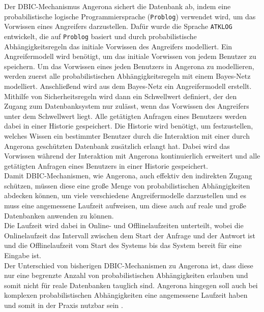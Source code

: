 \documentclass[german,version-2020-11]{uzl-thesis}
\begin{document}
Der DBIC-Mechanismus Angerona sichert die Datenbank ab, indem eine probabilistische logische Programmiersprache (\texttt{Problog}) verwendet wird, um das Vorwissen eines Angreifers darzustellen. Dafür wurde die Sprache \texttt{ATKLOG} entwickelt, die auf \texttt{Problog} basiert und durch probabilistische Abhängigkeitsregeln das initiale Vorwissen des Angreifers modelliert. Ein Angreifermodell wird benötigt, um das initiale Vorwissen von jedem Benutzer zu speichern.  Um das Vorwissen eines jeden Benutzers in Angerona zu modellieren, werden zuerst alle probabilistischen Abhängigkeitsregeln mit einem Bayes-Netz modelliert. Anschließend wird aus dem Bayes-Netz ein Angreifermodell erstellt. Mithilfe von Sicherheitsregeln wird dann ein Schwellwert definiert, der den Zugang zum Datenbanksystem nur zulässt, wenn das Vorwissen des Angreifers unter dem Schwellwert liegt. Alle getätigten Anfragen eines Benutzers werden dabei in einer Historie gespeichert. Die Historie wird benötigt, um festzustellen, welches Wissen ein bestimmter Benutzer durch die Interaktion mit einer durch Angerona geschützten Datenbank zusätzlich erlangt hat. Dabei wird das Vorwissen während der Interaktion mit Angerona kontinuierlich erweitert und alle getätigten Anfragen eines Benutzers in einer Historie gespeichert. \\  
Damit DBIC-Mechanismen, wie Angerona, auch effektiv den indirekten Zugang schützen, müssen diese eine große Menge von probabilistischen Abhängigkeiten abdecken können, um viele verschiedene Angreifermodelle darzustellen und es muss eine angemessene Laufzeit aufweisen, um diese auch auf reale und große Datenbanken anwenden zu können.\\
Die Laufzeit wird dabei in Online- und Offlinelaufzeiten unterteilt, wobei die Onlinelaufzeit  das Intervall zwischen dem Start der Anfrage und der Antwort ist und die Offlinelaufzeit  vom Start des Systems bis das System bereit für eine Eingabe ist. \\
Der Unterschied von bisherigen DBIC-Mechanismen zu Angerona ist, dass diese nur eine begrenzte Anzahl von probabilistischen Abhängigkeiten erlauben und somit nicht für reale Datenbanken tauglich sind. Angerona hingegen soll auch bei komplexen probabilistischen Abhängigkeiten eine angemessene Laufzeit haben und somit in der Praxis nutzbar sein \cite{guarnieri2017securing}. \\
\end{document}

